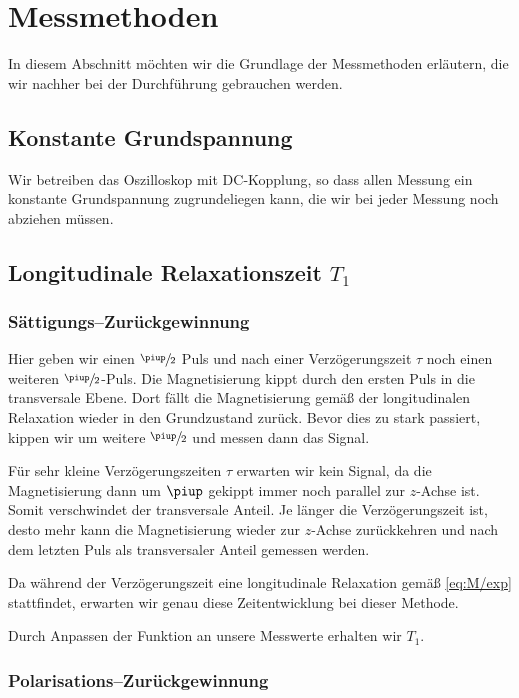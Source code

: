 \section{Messmethoden}

In diesem Abschnitt möchten wir die Grundlage der Messmethoden erläutern, die
wir nachher bei der Durchführung gebrauchen werden.

\subsection{Konstante Grundspannung}

Wir betreiben das Oszilloskop mit DC-Kopplung, so dass allen Messung ein
konstante Grundspannung zugrundeliegen kann, die wir bei jeder Messung noch
abziehen müssen.

\subsection{Longitudinale Relaxationszeit $T_1$}

\subsubsection{Sättigungs–Zurückgewinnung}

Hier geben wir einen $\sfrac\piup2$ Puls und nach einer Verzögerungszeit $\tau$
noch einen weiteren $\sfrac\piup2$-Puls. Die Magnetisierung kippt durch den
ersten Puls in die transversale Ebene. Dort fällt die Magnetisierung gemäß der
longitudinalen Relaxation wieder in den Grundzustand zurück. Bevor dies zu
stark passiert, kippen wir um weitere $\sfrac\piup2$ und messen dann das
Signal.

Für sehr kleine Verzögerungszeiten $\tau$ erwarten wir kein Signal, da die
Magnetisierung dann um $\piup$ gekippt immer noch parallel zur $z$-Achse ist.
Somit verschwindet der transversale Anteil. Je länger die Verzögerungszeit ist,
desto mehr kann die Magnetisierung wieder zur $z$-Achse zurückkehren und nach
dem letzten Puls als transversaler Anteil gemessen werden.

Da während der Verzögerungszeit eine longitudinale Relaxation gemäß
\eqref{eq:M/exp} stattfindet, erwarten wir genau diese Zeitentwicklung bei
dieser Methode.

Durch Anpassen der Funktion an unsere Messwerte erhalten wir $T_1$.

\subsubsection{Polarisations–Zurückgewinnung}

